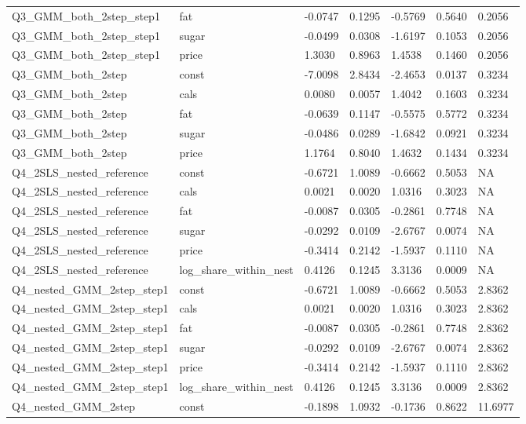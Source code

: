 \begin{table}[!htbp]
\begin{tabular}{lllllll}
\\
Q3\_GMM\_both\_2step\_step1 & fat & -0.0747 & 0.1295 & -0.5769 & 0.5640 & 0.2056
\\
Q3\_GMM\_both\_2step\_step1 & sugar & -0.0499 & 0.0308 & -1.6197 & 0.1053 & 0.2056
\\
Q3\_GMM\_both\_2step\_step1 & price & 1.3030 & 0.8963 & 1.4538 & 0.1460 & 0.2056
\\
Q3\_GMM\_both\_2step & const & -7.0098 & 2.8434 & -2.4653 & 0.0137 & 0.3234
\\
Q3\_GMM\_both\_2step & cals & 0.0080 & 0.0057 & 1.4042 & 0.1603 & 0.3234
\\
Q3\_GMM\_both\_2step & fat & -0.0639 & 0.1147 & -0.5575 & 0.5772 & 0.3234
\\
Q3\_GMM\_both\_2step & sugar & -0.0486 & 0.0289 & -1.6842 & 0.0921 & 0.3234
\\
Q3\_GMM\_both\_2step & price & 1.1764 & 0.8040 & 1.4632 & 0.1434 & 0.3234
\\
Q4\_2SLS\_nested\_reference & const & -0.6721 & 1.0089 & -0.6662 & 0.5053 & NA
\\
Q4\_2SLS\_nested\_reference & cals & 0.0021 & 0.0020 & 1.0316 & 0.3023 & NA
\\
Q4\_2SLS\_nested\_reference & fat & -0.0087 & 0.0305 & -0.2861 & 0.7748 & NA
\\
Q4\_2SLS\_nested\_reference & sugar & -0.0292 & 0.0109 & -2.6767 & 0.0074 & NA
\\
Q4\_2SLS\_nested\_reference & price & -0.3414 & 0.2142 & -1.5937 & 0.1110 & NA
\\
Q4\_2SLS\_nested\_reference & log\_share\_within\_nest & 0.4126 & 0.1245 & 3.3136 & 0.0009 & NA
\\
Q4\_nested\_GMM\_2step\_step1 & const & -0.6721 & 1.0089 & -0.6662 & 0.5053 & 2.8362
\\
Q4\_nested\_GMM\_2step\_step1 & cals & 0.0021 & 0.0020 & 1.0316 & 0.3023 & 2.8362
\\
Q4\_nested\_GMM\_2step\_step1 & fat & -0.0087 & 0.0305 & -0.2861 & 0.7748 & 2.8362
\\
Q4\_nested\_GMM\_2step\_step1 & sugar & -0.0292 & 0.0109 & -2.6767 & 0.0074 & 2.8362
\\
Q4\_nested\_GMM\_2step\_step1 & price & -0.3414 & 0.2142 & -1.5937 & 0.1110 & 2.8362
\\
Q4\_nested\_GMM\_2step\_step1 & log\_share\_within\_nest & 0.4126 & 0.1245 & 3.3136 & 0.0009 & 2.8362
\\
Q4\_nested\_GMM\_2step & const & -0.1898 & 1.0932 & -0.1736 & 0.8622 & 11.6977

\end{tabular}
\end{table}
